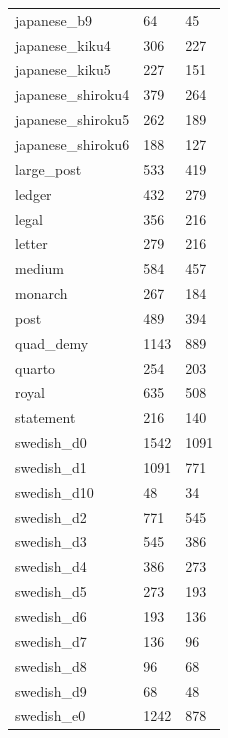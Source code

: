 {\begin{supertabular}{|lll|}
               japanese\_b9 &     64 &     45 \\ \shrinkheight{5mm}
            japanese\_kiku4 &    306 &    227 \\
            japanese\_kiku5 &    227 &    151 \\
         japanese\_shiroku4 &    379 &    264 \\
         japanese\_shiroku5 &    262 &    189 \\
         japanese\_shiroku6 &    188 &    127 \\
                large\_post &    533 &    419 \\
                     ledger &    432 &    279 \\
                      legal &    356 &    216 \\
                     letter &    279 &    216 \\
                     medium &    584 &    457 \\
                    monarch &    267 &    184 \\
                       post &    489 &    394 \\
                 quad\_demy &   1143 &    889 \\
                     quarto &    254 &    203 \\
                      royal &    635 &    508 \\
                  statement &    216 &    140 \\
                swedish\_d0 &   1542 &   1091 \\
                swedish\_d1 &   1091 &    771 \\
               swedish\_d10 &     48 &     34 \\
                swedish\_d2 &    771 &    545 \\
                swedish\_d3 &    545 &    386 \\
                swedish\_d4 &    386 &    273 \\
                swedish\_d5 &    273 &    193 \\
                swedish\_d6 &    193 &    136 \\
                swedish\_d7 &    136 &     96 \\
                swedish\_d8 &     96 &     68 \\
                swedish\_d9 &     68 &     48 \\
                swedish\_e0 &   1242 &    878 \\

\end{supertabular}}
